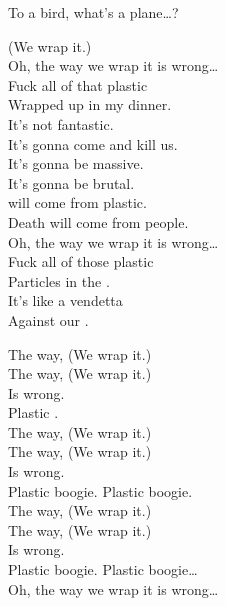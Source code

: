 To a bird, what's a plane…? \\





(We wrap it.) \\

Oh, the way we wrap it is wrong… \\

Fuck all of that plastic \\
Wrapped up in my dinner. \\
It's not fantastic. \\
It's gonna come and kill us. \\
It's gonna be massive. \\
It's gonna be brutal. \\
 will come from plastic. \\
Death will come from people. \\

Oh, the way we wrap it is wrong… \\

Fuck all of those plastic \\
Particles in the . \\
It's like a vendetta \\
Against our .

The way, (We wrap it.) \\
The way, (We wrap it.) \\
Is wrong. \\
Plastic . \\

The way, (We wrap it.) \\
The way, (We wrap it.) \\
Is wrong. \\
Plastic boogie. Plastic boogie. \\

The way, (We wrap it.) \\
The way, (We wrap it.) \\
Is wrong. \\
Plastic boogie. Plastic boogie… \\

Oh, the way we wrap it is wrong… \\

